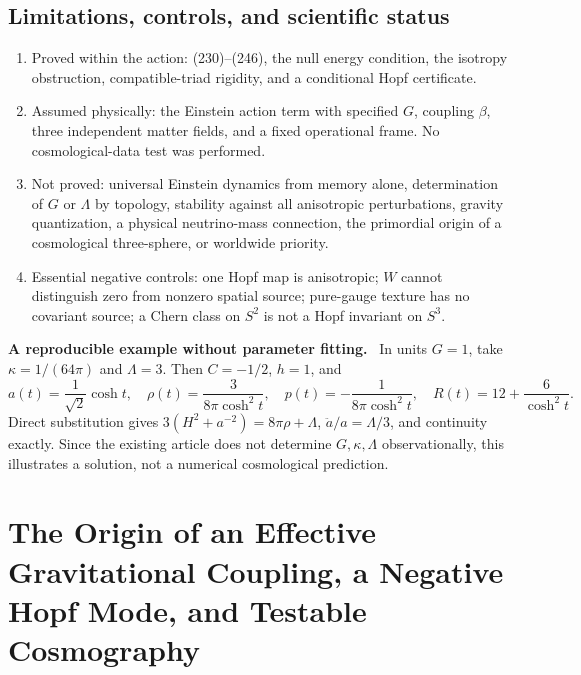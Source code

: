 \documentclass[11pt,a4paper,oneside]{book}
\newcommand{\note}[1]{\par\medskip\noindent\textbf{#1}\ }
\begin{document}
\section{Limitations, controls, and scientific status}
\begin{enumerate}
\item Proved within the action: (230)--(246), the null energy condition, the isotropy obstruction, compatible-triad rigidity, and a conditional Hopf certificate.
\item Assumed physically: the Einstein action term with specified $G$, coupling $\beta$, three independent matter fields, and a fixed operational frame. No cosmological-data test was performed.
\item Not proved: universal Einstein dynamics from memory alone, determination of $G$ or $\Lambda$ by topology, stability against all anisotropic perturbations, gravity quantization, a physical neutrino-mass connection, the primordial origin of a cosmological three-sphere, or worldwide priority.
\item Essential negative controls: one Hopf map is anisotropic; $W$ cannot distinguish zero from nonzero spatial source; pure-gauge texture has no covariant source; a Chern class on $S^2$ is not a Hopf invariant on $S^3$.
\end{enumerate}
\note{A reproducible example without parameter fitting.} In units $G=1$, take $\kappa=1/(64\pi)$ and $\Lambda=3$. Then $C=-1/2$, $h=1$, and
\begin{equation}a(t)=\frac1{\sqrt2}\cosh t,\quad\rho(t)=\frac3{8\pi\cosh^2t},\quad p(t)=-\frac1{8\pi\cosh^2t},\quad R(t)=12+\frac6{\cosh^2t}.\tag{252}\end{equation}
Direct substitution gives $3(H^2+a^{-2})=8\pi\rho+\Lambda$, $\ddot a/a=\Lambda/3$, and continuity exactly. Since the existing article does not determine $G,\kappa,\Lambda$ observationally, this illustrates a solution, not a numerical cosmological prediction.
\setcounter{equation}{252}


\chapter{The Origin of an Effective Gravitational Coupling, a Negative Hopf Mode, and Testable Cosmography}
\end{document}
